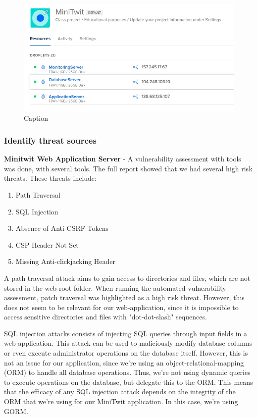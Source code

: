 \begin{figure}[H]
    \centering
    \includegraphics[scale=.5]{images/digitalocean_droplets.jpg}
    \caption{Caption}
    \label{fig:digitalocean_droplets}
\end{figure}

\subsubsection{Identify threat sources}
\textbf{Minitwit Web Application Server} - A vulnerability assessment with tools was done, with several tools. The full report\cite{security_assesment_report} showed that we had several high risk threats. These threats include: 

\begin{enumerate}
    \item Path Traversal
    \item SQL Injection
    \item Absence of Anti-CSRF Tokens
    \item CSP Header Not Set
    \item Missing Anti-clickjacking Header
\end{enumerate}

A path traversal attack aims to gain access to directories and files, which are not stored in the web root folder\cite{owasp_path_traversal}. When running the automated vulnerability assessment, patch traversal was highlighted as a high risk threat. However, this does not seem to be relevant for our web-application, since it is impossible to access sensitive directories and files with "dot-dot-slash" sequences.


SQL injection attacks consists of injecting SQL queries through input fields in a web-application\cite{owasp_sql_injection}. This attack can be used to maliciously modify database columns or even execute administrator operations on the database itself. However, this is not an issue for our application, since we're using an object-relational-mapping (ORM) to handle all database operations. Thus, we're not using dynamic queries to execute operations on the database, but delegate this to the ORM. This means that the efficacy of any SQL injection attack depends on the integrity of the ORM that we're using for our MiniTwit application. In this case, we're using GORM.\cite{gorm}


